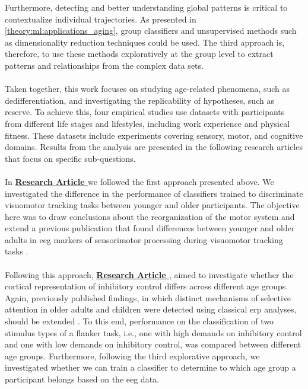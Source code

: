 Furthermore, detecting and better understanding global patterns is critical to contextualize individual trajectories. As presented in \ref{theory:ml:applications_aging}, group classifiers and unsupervised methods such as dimensionality reduction techniques could be used. The third approach is, therefore, to use these methods exploratively at the group level to extract patterns and relationships from the complex data sets.\\
\\
Taken together, this work focuses on studying age-related phenomena, such as dedifferentiation, and investigating the replicability of hypotheses, such as reserve. To achieve this, four empirical studies use datasets with participants from different life stages and lifestyles, including work experience and physical fitness. These datasets include experiments covering sensory, motor, and cognitive domains. Results from the analysis are presented in the following research articles that focus on specific sub-questions.\\
\\
In \textbf{\hyperref[pub:paperI]{Research Article }} we followed the first approach presented above. We investigated the difference in the performance of classifiers trained to discriminate visuomotor tracking tasks between younger and older participants. The objective here was to draw conclusions about the reorganization of the motor system and extend a previous publication that found differences between younger and older adults in \gls{eeg} markers of sensorimotor processing during visuomotor tracking tasks \cite{vieluf2018age}.\\
\\
Following this approach, \textbf{\hyperref[pub:paperII]{Research Article }}, aimed to investigate whether the cortical representation of inhibitory control differs across different age groups. Again, previously published findings, in which distinct mechanisms of selective attention in older adults and children were detected using classical \gls{erp} analyses, should be extended \cite{Reuter2019}. To this end, performance on the classification of two stimulus types of a flanker task, i.e., one with high demands on inhibitory control and one with low demands on inhibitory control, was compared between different age groups. Furthermore, following the third explorative approach, we investigated whether we can train a classifier to determine to which age group a participant belongs based on the \gls{eeg} data.\\

